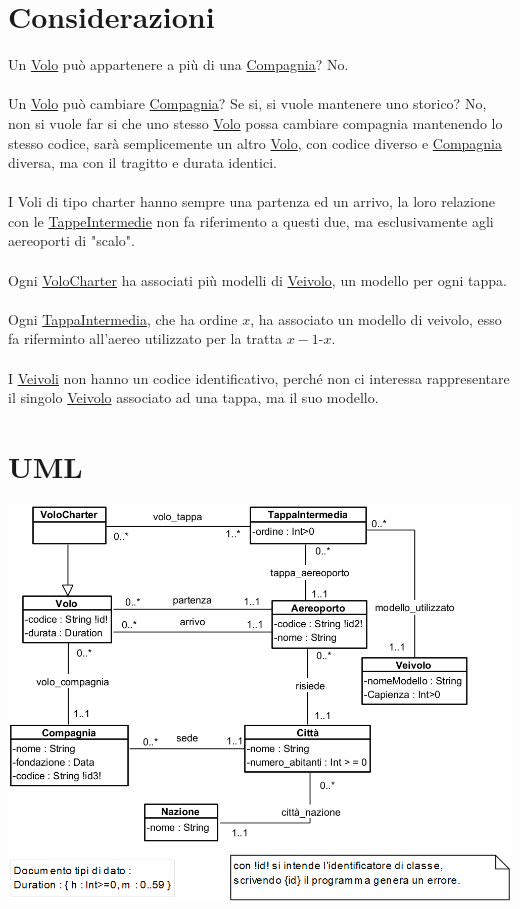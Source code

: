 \documentclass[12pt, letterpaper]{article}
\newcommand{\acc}{\\\hphantom{}\\}
\begin{document}
\section{Considerazioni}
Un \underline{Volo} può appartenere a più di una \underline{Compagnia}? No.\acc 
Un \underline{Volo} può cambiare \underline{Compagnia}? Se si, si vuole mantenere uno storico? No, non si vuole far si che uno stesso 
\underline{Volo} possa cambiare compagnia mantenendo lo stesso codice, sarà semplicemente un altro  \underline{Volo}, con codice 
diverso e \underline{Compagnia} diversa, ma con il tragitto e durata identici.\acc
I Voli di tipo charter hanno sempre una partenza ed un arrivo, la loro relazione con le \underline{TappeIntermedie} non 
fa riferimento a questi due, ma esclusivamente agli aereoporti di "scalo".
\acc 
Ogni \underline{VoloCharter} ha associati più modelli di \underline{Veivolo}, un modello per ogni tappa.
\acc 
Ogni \underline{TappaIntermedia}, che ha ordine $x$, ha associato un modello di veivolo, esso fa riferminto all'aereo utilizzato 
per la tratta $x-1$-$x$.\acc 
I \underline{Veivoli} non hanno un codice identificativo, perché non ci interessa rappresentare il singolo 
\underline{Veivolo} associato ad una tappa, ma il suo modello.
\section{UML}
\includegraphics[width=\textwidth]{images/UML.png}
\end{document}
